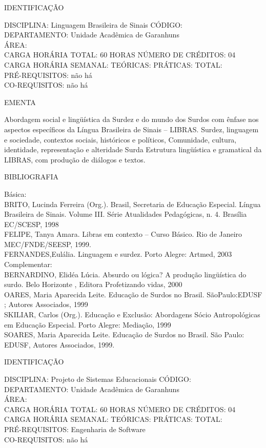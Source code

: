 \documentclass[
	12pt,				%
	openright,			%
  oneside,     %
	a4paper,			%
	chapter=TITLE,		%
	english,			%
	french,				%
	spanish,			%
	brazil				%
	]{abntex2}
\begin{document}
\begin{apendicesenv}
\newpage IDENTIFICAÇÃO

DISCIPLINA: Linguagem Brasileira de Sinais CÓDIGO:\\ 
DEPARTAMENTO: Unidade Acadêmica de Garanhuns\\
ÁREA: \\
CARGA HORÁRIA TOTAL: 60 HORAS NÚMERO DE CRÉDITOS: 04\\
CARGA HORÁRIA SEMANAL: TEÓRICAS: PRÁTICAS: TOTAL: \\
PRÉ-REQUISITOS: não há\\
CO-REQUISITOS: não há

EMENTA 

Abordagem social e lingüística da Surdez e do mundo dos Surdos com
ênfase nos aspectos específicos da Língua Brasileira de Sinais --
LIBRAS. Surdez, linguagem e sociedade, contextos sociais, históricos e
políticos, Comunidade, cultura, identidade, representação e alteridade Surda 
Estrutura lingüística e gramatical da LIBRAS, com produção de diálogos e
textos.

BIBLIOGRAFIA 

Básica:\\
BRITO, Lucinda Ferreira (Org.). Brasil, Secretaria de Educação Especial.
Língua Brasileira de Sinais. Volume III. Série Atualidades Pedagógicas,
n. 4. Brasília EC/SCESP, 1998\\
FELIPE, Tanya Amara. Libras em contexto -- Curso Básico. Rio de Janeiro
MEC/FNDE/SEESP, 1999.\\
FERNANDES,Eulália. Linguagem e surdez. Porto Alegre: Artmed, 2003\\
Complementar:\\
BERNARDINO, Elidéa Lúcia. Absurdo ou lógica? A produção lingüística do
surdo. Belo Horizonte , Editora Profetizando vidas, 2000\\
OARES, Maria Aparecida Leite. Educação de Surdos no Brasil.
SãoPaulo:EDUSF ; Autores Associados, 1999\\
SKILIAR, Carlos (Org.). Educação e Exclusão: Abordagens Sócio 
Antropológicas em Educação Especial. Porto Alegre: Mediação, 1999\\
SOARES, Maria Aparecida Leite. Educação de Surdos no Brasil. São Paulo:
EDUSF, Autores Associados, 1999.

\newpage IDENTIFICAÇÃO

DISCIPLINA: Projeto de Sistemas Educacionais CÓDIGO:\\ 
DEPARTAMENTO: Unidade Acadêmica de Garanhuns\\
ÁREA: \\
CARGA HORÁRIA TOTAL: 60 HORAS NÚMERO DE CRÉDITOS: 04\\
CARGA HORÁRIA SEMANAL: TEÓRICAS: PRÁTICAS: TOTAL: \\
PRÉ-REQUISITOS: Engenharia de Software\\
CO-REQUISITOS: não há


\end{apendicesenv}
\end{document}
